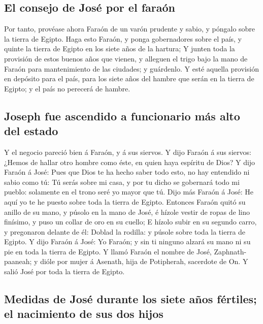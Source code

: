 \hypertarget{el-consejo-de-josuxe9-por-el-farauxf3n}{%
\subsection{El consejo de José por el
faraón}\label{el-consejo-de-josuxe9-por-el-farauxf3n}}

 Por tanto, provéase ahora Faraón de un varón prudente y
sabio, y póngalo sobre la tierra de Egipto.  Haga esto
Faraón, y ponga gobernadores sobre el país, y quinte la tierra de Egipto
en los siete años de la hartura;  Y junten toda la
provisión de estos buenos años que vienen, y alleguen el trigo bajo la
mano de Faraón para mantenimiento de las ciudades; y guárdenlo.
 Y esté aquella provisión en depósito para el país, para
los siete años del hambre que serán en la tierra de Egipto; y el país no
perecerá de hambre.

\hypertarget{joseph-fue-ascendido-a-funcionario-muxe1s-alto-del-estado}{%
\subsection{Joseph fue ascendido a funcionario más alto del
estado}\label{joseph-fue-ascendido-a-funcionario-muxe1s-alto-del-estado}}

 Y el negocio pareció bien á Faraón, y á sus siervos.
 Y dijo Faraón á sus siervos: ¿Hemos de hallar otro
hombre como éste, en quien haya espíritu de Dios?  Y dijo
Faraón á José: Pues que Dios te ha hecho saber todo esto, no hay
entendido ni sabio como tú:  Tú serás sobre mi casa, y
por tu dicho se gobernará todo mi pueblo: solamente en el trono seré yo
mayor que tú.  Dijo más Faraón á José: He aquí yo te he
puesto sobre toda la tierra de Egipto.  Entonces Faraón
quitó su anillo de su mano, y púsolo en la mano de José, é hízole vestir
de ropas de lino finísimo, y puso un collar de oro en su cuello;
 E hízolo subir en su segundo carro, y pregonaron delante
de él: Doblad la rodilla: y púsole sobre toda la tierra de Egipto.
 Y dijo Faraón á José: Yo Faraón; y sin ti ninguno alzará
su mano ni su pie en toda la tierra de Egipto.  Y llamó
Faraón el nombre de José, Zaphnath-paaneah; y dióle por mujer á Asenath,
hija de Potipherah, sacerdote de On. Y salió José por toda la tierra de
Egipto.

\hypertarget{medidas-de-josuxe9-durante-los-siete-auxf1os-fuxe9rtiles-el-nacimiento-de-sus-dos-hijos}{%
\subsection{Medidas de José durante los siete años fértiles; el
nacimiento de sus dos
hijos}\label{medidas-de-josuxe9-durante-los-siete-auxf1os-fuxe9rtiles-el-nacimiento-de-sus-dos-hijos}}

